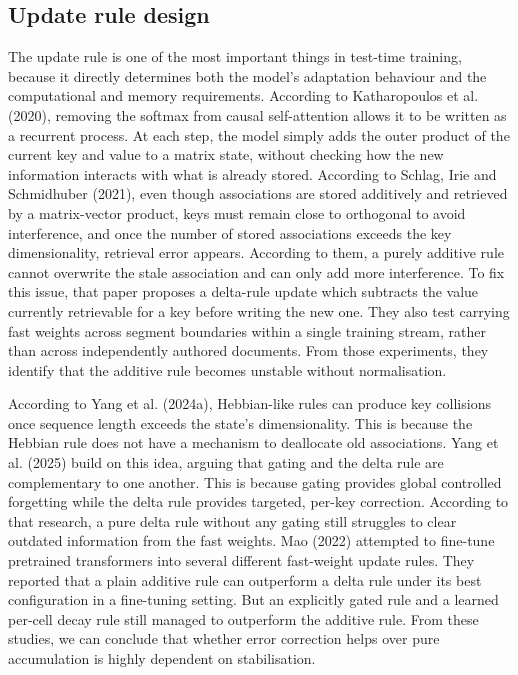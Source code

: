 \documentclass[12pt,a4paper]{article}
\begin{document}
\subsection*{Update rule design}

The update rule is one of the most important things in test-time training, because it directly determines both the model's adaptation behaviour and the computational and memory requirements. According to Katharopoulos et al. (2020), removing the softmax from causal self-attention allows it to be written as a recurrent process. At each step, the model simply adds the outer product of the current key and value to a matrix state, without checking how the new information interacts with what is already stored. According to Schlag, Irie and Schmidhuber (2021), even though associations are stored additively and retrieved by a matrix-vector product, keys must remain close to orthogonal to avoid interference, and once the number of stored associations exceeds the key dimensionality, retrieval error appears. According to them, a purely additive rule cannot overwrite the stale association and can only add more interference. To fix this issue, that paper proposes a delta-rule update which subtracts the value currently retrievable for a key before writing the new one. They also test carrying fast weights across segment boundaries within a single training stream, rather than across independently authored documents. From those experiments, they identify that the additive rule becomes unstable without normalisation.

According to Yang et al. (2024a), Hebbian-like rules can produce key collisions once sequence length exceeds the state's dimensionality. This is because the Hebbian rule does not have a mechanism to deallocate old associations. Yang et al. (2025) build on this idea, arguing that gating and the delta rule are complementary to one another. This is because gating provides global controlled forgetting while the delta rule provides targeted, per-key correction. According to that research, a pure delta rule without any gating still struggles to clear outdated information from the fast weights. Mao (2022) attempted to fine-tune pretrained transformers into several different fast-weight update rules. They reported that a plain additive rule can outperform a delta rule under its best configuration in a fine-tuning setting. But an explicitly gated rule and a learned per-cell decay rule still managed to outperform the additive rule. From these studies, we can conclude that whether error correction helps over pure accumulation is highly dependent on stabilisation.
\end{document}
